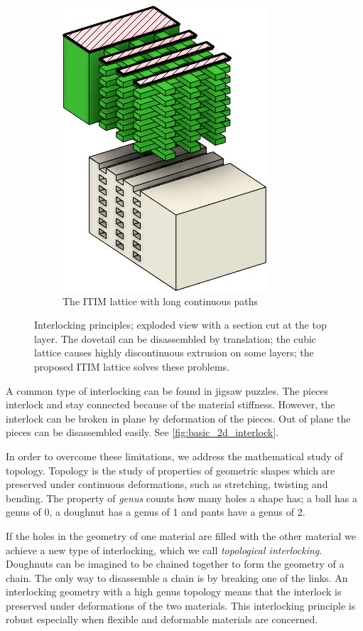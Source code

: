 \begin{figure}
\begin{subfigure}[B]{.36\columnwidth}
		\includegraphics[height=\figheight]{sources/method/basic_lattice.jpg}
		\caption{The ITIM lattice with long continuous paths}
		\label{fig:basic_structure_single_mat}
	\end{subfigure}
	\caption{Interlocking principles; exploded view with a section cut at the top layer. The dovetail can be disassembled by translation; the cubic lattice causes highly discontinuous extrusion on some layers; the proposed ITIM lattice solves these problems.}
	\label{fig:basic_structure}
\end{figure}






A common type of interlocking can be found in jigsaw puzzles.
The pieces interlock and stay connected because of the material stiffness.
However, the interlock can be broken in plane by deformation of the pieces.
Out of plane the pieces can be disassembled easily.
See \cref{fig:basic_2d_interlock}.

In order to overcome these limitations, we address the mathematical study of topology.
Topology is the study of properties of geometric shapes which are preserved under continuous deformations, such as stretching, twisting and bending.
The property of \emph{genus} counts how many holes a shape has;
a ball has a genus of 0, a doughnut has a genus of 1 and pants have a genus of 2.

If the holes in the geometry of one material are filled with the other material we achieve a new type of interlocking, which we call \emph{topological interlocking}.
Doughnuts can be imagined to be chained together to form the geometry of a chain.
The only way to disassemble a chain is by breaking one of the links.
An interlocking geometry with a high genus topology means that the interlock is preserved under deformations of the two materials.
This interlocking principle is robust especially when flexible and deformable materials are concerned.

